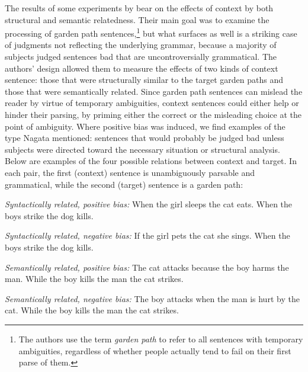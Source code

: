 The results of some experiments by \citet{WarnerEtAl1987} bear on the effects of context by both structural and semantic relatedness. Their main goal was to examine the processing of garden path sentences,\footnote{The authors use the term \textit{garden path} to refer to all sentences with temporary ambiguities, regardless of whether people actually tend to fail on their first parse of them.}
but what surfaces as well is a striking case of judgments not reflecting the underlying grammar, because a majority of subjects judged sentences bad that are uncontroversially grammatical. The authors' design allowed them to measure the  effects  of  two kinds of context sentence: those that were structurally similar to the target garden paths and those that were semantically related. Since garden path sentences can mislead the reader by virtue of temporary ambiguities, context sentences could either help or hinder their parsing, by priming either the correct or the misleading choice at the point of ambiguity. Where positive bias was induced, we find examples of the type Nagata mentioned: sentences that would probably be judged bad unless subjects were directed toward the necessary situation or structural analysis. Below are examples of the four possible relations between context and target. In each pair, the first (context) sentence is unambiguously parsable and grammatical, while the second (target) sentence is a garden path:

\ea\label{ex:5:16} 
\textit{Syntactically related, positive  bias:}
\ea  When the girl sleeps the cat eats.
\ex  When the boys strike the  dog kills.
\z
\z

 
\ea\label{ex:5:17} 
\textit{Syntactically  related, negative bias:}
\ea
If the girl pets the cat she sings.
\ex
When the boys strike the dog kills.
\z
\z

\ea\label{ex:5:18} 
 \textit{Semantically  related, positive  bias:}
\ea
The cat attacks because the boy harms the man.
\ex
While the boy kills the man the cat strikes.
\z
\z

\ea\label{ex:5:19} 
 \textit{Semantically  related, negative bias:}
\ea
The boy attacks when the man is hurt by the cat.
\ex
While the boy kills the man the cat strikes.
\z
\z

